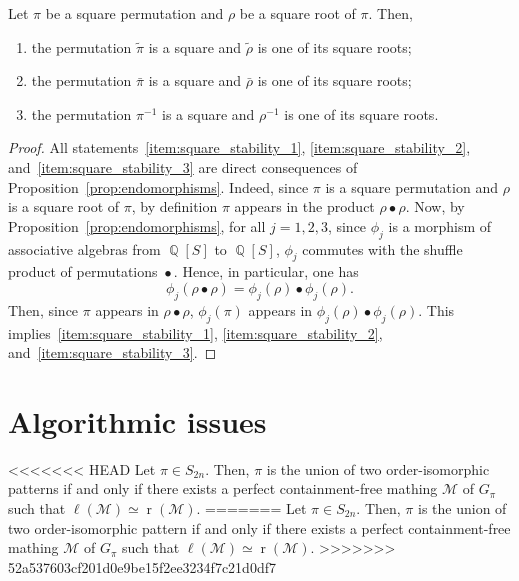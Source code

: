\documentclass[a4paper,10pt]{llncs}
\DeclareMathOperator{\LEFT}{\ell}
\DeclareMathOperator{\RIGHT}{r}
\DeclareMathOperator{\QQ}{\mathbb{Q}}
\DeclareMathOperator{\SHUFFLE}{\bullet}
\begin{document}
\begin{proposition} \label{prop:square_stability}
    Let $\pi$ be a square permutation and $\rho$ be a square root of
    $\pi$. Then,
    \begin{enumerate}[label={\it (\roman*)},fullwidth]
        \item \label{item:square_stability_1}
        the permutation $\widetilde{\pi}$ is a square and
        $\widetilde{\rho}$ is one of its square roots;
        \item \label{item:square_stability_2}
        the permutation $\bar \pi$ is a square and $\bar \rho$ is one of
        its square roots;
        \item \label{item:square_stability_3}
        the permutation $\pi^{-1}$ is a square and $\rho^{-1}$ is one of
        its square roots.
    \end{enumerate}
\end{proposition}
\begin{proof}
    All statements~\ref{item:square_stability_1},
    \ref{item:square_stability_2}, and~\ref{item:square_stability_3} are
    direct consequences of Proposition~\ref{prop:endomorphisms}. Indeed,
    since $\pi$ is a square permutation and $\rho$ is a square root of
    $\pi$, by definition $\pi$ appears in the product
    $\rho \SHUFFLE \rho$. Now, by Proposition~\ref{prop:endomorphisms},
    for all $j = 1, 2, 3$, since $\phi_j$ is a morphism of associative
    algebras from $\QQ[S]$ to $\QQ[S]$, $\phi_j$ commutes with the
    shuffle product of permutations $\SHUFFLE$. Hence, in particular,
    one has
    \begin{equation}
        \phi_j(\rho \SHUFFLE \rho) =
        \phi_j(\rho) \SHUFFLE \phi_j(\rho).
    \end{equation}
    Then, since $\pi$ appears in $\rho \SHUFFLE \rho$, $\phi_j(\pi)$
    appears in $\phi_j(\rho) \SHUFFLE \phi_j(\rho)$. This
    implies~\ref{item:square_stability_1}, \ref{item:square_stability_2},
    and~\ref{item:square_stability_3}.
\end{proof}
\medskip


\section{Algorithmic issues}
\label{section:Algorithmic issues}


\begin{proposition}
<<<<<<< HEAD
  \label{proposition:matching}
  Let $\pi \in S_{2n}$.
  Then,
  $\pi$ is the union of two order-isomorphic patterns
  if and only if
  there exists a perfect containment-free mathing
  $\mathcal{M}$ of $G_\pi$ such that
  $\LEFT(\mathcal{M}) \simeq \RIGHT(\mathcal{M})$.
=======
Let $\pi \in S_{2n}$.
Then,
$\pi$ is the union of two order-isomorphic pattern
if and only if
there exists a perfect containment-free mathing
$\mathcal{M}$ of $G_\pi$ such that
$\LEFT(\mathcal{M}) \simeq \RIGHT(\mathcal{M})$.
>>>>>>> 52a537603cf201d0e9be15f2ee3234f7c21d0df7
\end{proposition}
\end{document}
